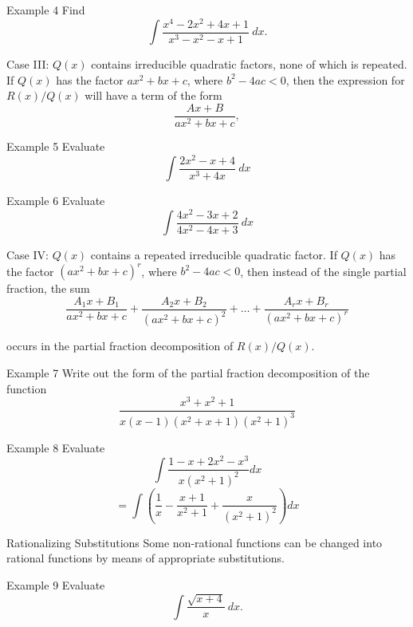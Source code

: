 \documentclass{beamer}
\begin{document}
\begin{frame}{Example 4}
Find \[\int \dfrac{x^4 -2x^2 +4x +1}{x^3 -x^2 -x+1}~dx.\]
\end{frame}

\begin{frame}{Case III: \(Q(x)\) contains irreducible quadratic factors, none of which is repeated. }
If \(Q(x)\) has the factor \(ax^2 +bx +c\), where \(b^2 -4ac <0\), then the expression for \(R(x)/Q(x)\) will have a term of the form \[\dfrac{Ax+B}{ax^2 +bx +c},\] 
\end{frame}

\begin{frame}{Example 5}
Evaluate \[\int \dfrac{2x^2 -x +4}{x^3+4x}~dx\]
\end{frame}

\begin{frame}{Example 6}
Evaluate \[\int \dfrac{4x^2 -3x +2}{4x^2-4x+3}~dx\]
\end{frame}

\begin{frame}{Case IV: \(Q(x)\) contains a repeated irreducible quadratic factor.}
If \(Q(x)\) has the factor \((ax^2+bx+c)^r\), where \(b^2 -4ac<0\), then instead of the single partial fraction, the sum \[\dfrac{A_1x +B_1}{ax^2+bx+c}+\dfrac{A_2x +B_2}{(ax^2+bx+c)^2}+\dots+\dfrac{A_rx +B_r}{(ax^2+bx+c)^r}\]

occurs in the partial fraction decomposition of \(R(x)/Q(x)\).
\end{frame}

\begin{frame}{Example 7}
Write out the form of the partial fraction decomposition of the function \[
\dfrac{x^3 +x^2 +1}{x(x-1)(x^2+x+1)(x^2+1)^3}
\]
\end{frame}

\begin{frame}{Example 8}
Evaluate \[
\int \dfrac{1-x+2x^2-x^3}{x(x^2+1)^2}dx
\]\pause
\[= \int \left(\dfrac{1}{x}-\dfrac{x+1}{x^2+1}+\dfrac{x}{(x^2+1)^2}\right)dx\]
\end{frame}

\begin{frame}{Rationalizing Substitutions}
Some non-rational functions can be changed into rational functions by means of appropriate substitutions. 
\begin{block}{Example 9}
Evaluate \[\int \dfrac{\sqrt{x+4}}{x}~dx.\]
\end{block}
\end{frame}
\end{document}
